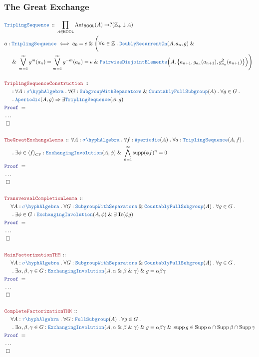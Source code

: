 \documentclass[12pt]{scrartcl}
\newcommand{\TYPE}[1]{\textcolor{NavyBlue}{\mathtt{#1}}}
\newcommand{\LOGIC}[1]{\textcolor{Blue}{\mathtt{#1}}}
\newcommand{\THM}[1]{\textcolor{Maroon}{\mathtt{#1}}}
\renewcommand{\.}{\; . \;}
\newcommand{\Theorem}[2]{& \THM{#1} \, :: \, #2 \\ & \Proof = \\ }
\newcommand{\DeclareType}[2]{& \TYPE{#1} \, :: \, #2 \\}
\newcommand{\DefineType}[3]{& #1 : \TYPE{#2} \iff #3 \\}
\newcommand{\NewLine}{\\ & \kern 1pc}
\newcommand{\Page}[1]{ \begin{align*} #1 \end{align*}   }
\newcommand{\NoProof}{ & \ldots \\ \EndProof}
\renewcommand{\And}{\; \& \;}
\newcommand{\Imply}{\Rightarrow}
\newcommand{\Int}{\mathbb{Z} }
\DeclareMathOperator*{\supp}{supp}
\newcommand{\Aut}{\mathrm{Aut}}
\newcommand{\QED}{\; \square}
\newcommand{\EndProof}{& \QED \\}
\newcommand{\Proof}{\LOGIC{Proof} \; }
\newcommand{\SA}{\TYPE{\sigma \hyph Algebra}}
\newcommand{\PD}{\TYPE{PairwiseDisjointElements}}
\newcommand{\TAlgebra}{\TYPE{\tau\hyph Algebra}}
\newcommand{\FS}{\TYPE{FullSubgroup}}
\newcommand{\CFS}{\TYPE{CountablyFullSubgroup}}
\newcommand{\EI}{\TYPE{ExchangingInvolution}}
\newcommand{\SwS}{\TYPE{SubgroupWithSeparators}}
\DeclareMathOperator{\Supp}{Supp}
\newcommand{\genCFS}[1]{\left\langle #1 \right\rangle_\mathrm{CF}}
\DeclareMathOperator{\Tr}{Tr}
\newcommand{\BOOL}{\mathsf{BOOL}}
\begin{document}
\subsubsection{The Great Exchange}
\Page{
	\DeclareType{TriplingSequence}
	{
		\prod_{A \in \BOOL}\Aut_\BOOL(A)\to ?(\Int_+ \downarrow A)
	}
	\DefineType{a}{TriplingSequence}
	{
		a_0 = e
		\And
		\Bigg(\forall n \in \Int \. \TYPE{DoublyRecurrentOn}(A,a_n,g) 
			\And \NewLine \And 
			\bigvee^\infty_{m=1} g^m( a_n ) = 		
			\bigvee^\infty_{m=1} g^{-m}( a_n )	= e
			\And 
			\PD\Big(A,\big\{a_{n+1},g_{a_n}(a_{n+1}),g_{a_n}^2(a_{n+1})\big\}\Big)
		\Bigg)
	}
	\\	
	\Theorem{TriplingSequenceConstruction}
	{
		\NewLine :
		\forall A : \SA \.
		\forall  G : \SwS \And \CFS(A) \.
		\forall g \in G \.	\NewLine \.
		\TYPE{Aperiodic}(A,g) 
		\Imply
		\exists \TYPE{TriplingSequence}(A,g)
 	}
 	\NoProof
 	\\
 	\Theorem{TheGreatExchangeLemma}
 	{
 		\forall A : \SA \.
 		\forall f : \TYPE{Aperiodic}(A) \.
 		\forall a : \TYPE{TriplingSequence}(A,f) \. \NewLine \.
 		\exists \phi \in \genCFS{f} :
 		\EI(A,\phi) \And \bigwedge^\infty_{n=1} \supp( \phi f )^n =  0
 	}
 	\NoProof
 	\\
 	\Theorem{
		 	TransversalCompletionLemma
 	}
 	{
		\NewLine  		
 		\forall A : \SA \. 
 		\forall G : \SwS \And \CFS(A) \.
 		\forall g \in G \. \NewLine \.
 		\exists \phi \in G :
 		\EI(A,\phi) \And \exists \Tr(\phi g) 
 	}
 	\NoProof
 	\\
 	\Theorem{
 		MainFactorizationTHM
 	}
 	{
 		\NewLine  		
 		\forall A : \SA \. 
 		\forall G : \SwS \And \CFS(A) \.
		\forall g \in G \. \NewLine \.
		\exists \alpha,\beta,\gamma \in G :
		\EI(A,\alpha \And \beta \And \gamma)
		\And g = \alpha \beta \gamma
 	}
 	\NoProof
 	\\
 	\Theorem{
 		CompleteFactorizationTHM
 	}
 	{
 		\NewLine  		
 		\forall A : \TAlgebra \. 
 		\forall G :  \FS(A) \.
		\forall g \in G \. \NewLine \.
		\exists \alpha,\beta,\gamma \in G :
		\EI(A,\alpha \And \beta \And \gamma)
		\And g = \alpha \beta \gamma \And
		\supp g \in \Supp \alpha \cap \Supp \beta \cap \Supp \gamma
 	}
 	\NoProof
}
\newpage
\end{document}

